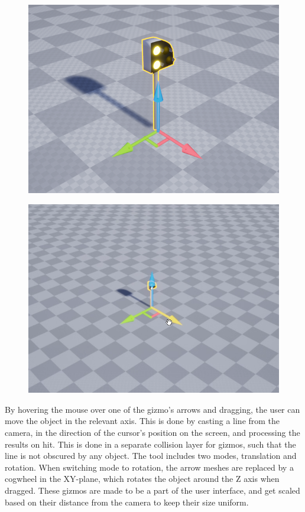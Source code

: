 \begin{figure}[h]
\centering
\begin{minipage}{.5\textwidth}
  \centering
  \includegraphics[width=0.95\linewidth]{figures/Gizmo1.png}
  \label{fig:test1}
\end{minipage}%
\begin{minipage}{.5\textwidth}
  \centering
  \includegraphics[width=0.95\linewidth]{figures/Gizmo2.png}
  \label{fig:test2}
\end{minipage}
\end{figure}

By hovering the mouse over one of the gizmo's arrows and dragging, the user can move the object in the relevant axis. This is done by casting a line from the camera, in the direction of the cursor's position on the screen, and processing the results on hit. This is done in a separate collision layer for gizmos, such that the line is not obscured by any object. The tool includes two modes, translation and rotation. When switching mode to rotation, the arrow meshes are replaced by a cogwheel in the XY-plane, which rotates the object around the Z axis when dragged. These gizmos are made to be a part of the user interface, and get scaled based on their distance from the camera to keep their size uniform. 

